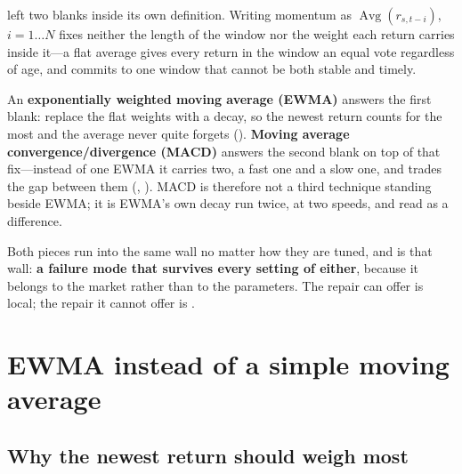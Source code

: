 

 left two blanks inside its own
definition. Writing momentum as $\operatorname{Avg}(r_{s,t-i})$, $i = 1 \ldots N$ fixes neither the
length of the window nor the weight each return carries inside it---a flat average gives every
return in the window an equal vote regardless of age, and commits to one window that cannot be both
stable and timely.

An \textbf{exponentially weighted moving average (EWMA)} answers the first blank: replace the flat
weights with a decay, so the newest return counts for the most and the average never quite forgets
(). \textbf{Moving average convergence/divergence (MACD)} answers the second blank
on top of that fix---instead of one EWMA it carries two, a fast one and a slow one, and trades the
gap between them (, ). MACD is therefore not a third
technique standing beside EWMA; it is EWMA's own decay run twice, at two speeds, and read as a
difference.

Both pieces run into the same wall no matter how they are tuned, and  is
that wall: \textbf{a failure mode that survives every setting of either}, because it belongs to the
market rather than to the parameters. The repair  can offer is local; the
repair it cannot offer is .


\section{EWMA instead of a simple moving average}\label{sec:ewma}

\subsection{Why the newest return should weigh most}\label{sec:newest-weighs-most}

